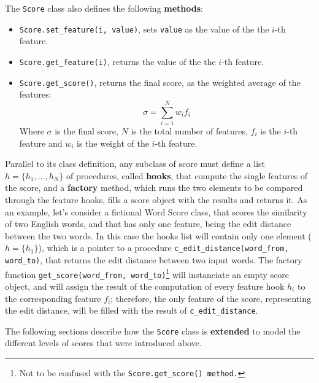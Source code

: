 The \texttt{Score} class also defines the following \textbf{methods}:
\begin{itemize}
	\item \texttt{Score.set\_feature(i, value)}, sets \texttt{value} as the value of the the $i$-th feature.
	\item \texttt{Score.get\_feature(i)}, returns the value of the the $i$-th feature.
	\item \texttt{Score.get\_score()}, returns the final score, as the weighted average of the features:
	\begin{displaymath}
		\sigma=\sum\limits_{i=1}^Nw_if_i
	\end{displaymath}
	Where $\sigma$ is the final score, $N$ is the total number of features, $f_i$ is the $i$-th feature and $w_i$ is the weight of the $i$-th feature.
\end{itemize}

Parallel to its class definition, any subclass of score must define a list $h = \{h_1, ..., h_N\}$ of procedures, called \textbf{hooks}, that compute the single features of the score, and a \textbf{factory} method, which runs the two elements to be compared through the feature hooks, fills a score object with the results and returns it. As an example, let's consider a fictional Word Score class, that scores the similarity of two English words, and that has only one feature, being the edit distance between the two words. In this case the hooks list will contain only one element ($h=\{h_1\}$), which is a pointer to a procedure \texttt{c\_edit\_distance(word\_from, word\_to)}, that returns the edit distance between two input words. The factory function \texttt{get\_score(word\_from, word\_to)}\footnote{Not to be confused with the \texttt{Score.get\_score() method.}} will instanciate an empty score object, and will assign the result of the computation of every feature hook $h_i$ to the corresponding feature $f_i$; therefore, the only feature of the score, representing the edit distance, will be filled with the result of \texttt{c\_edit\_distance}.

The following sections describe how the \texttt{Score} class is \textbf{extended} to model the different levels of scores that were introduced above.

